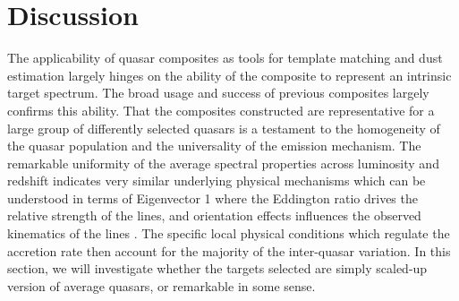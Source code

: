 \documentclass{aa}    %
\newcommand{\sectlabel}[1]{\label{sect:#1}}
\newcommand{\todo}[3]{{\color{#2}\emph{#1}: #3}}
\newcommand{\jstodo}[1]{\todo{TODO }{green}{#1}}
\newcommand{\qtodo}[1]{\todo{Question}{red}{#1}}
\begin{document}
\section{Discussion}  \sectlabel{discuss}

The applicability of quasar composites as tools for template matching and dust estimation largely hinges on the ability of the composite to represent an intrinsic target spectrum. The broad usage and success of previous composites largely confirms this ability. That the composites constructed are representative for a large group of differently selected quasars is a testament to the homogeneity of the quasar population and the universality of the emission mechanism.
The remarkable uniformity of the average spectral properties across luminosity and redshift indicates very similar underlying physical mechanisms which can be understood in terms of Eigenvector 1 \citep{Boroson1992, Francis1992} where the Eddington ratio drives the relative strength of the lines, and orientation effects influences the observed kinematics of the lines \citep{Shen2014a}. The specific local physical conditions which regulate the accretion rate then account for the majority of the inter-quasar variation. In this section, we will investigate whether the targets selected are simply scaled-up version of average quasars, or remarkable in some sense.


%
%
\end{document}
